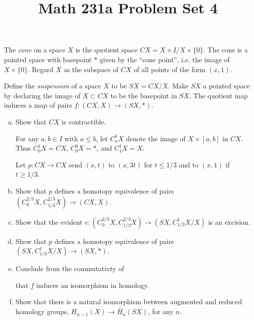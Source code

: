 \documentclass[11pt,letterpaper]{article}
\title{\textbf{Math 231a Problem Set 4}}
\begin{document}
\maketitle

\begin{problem}
    The \emph{cone} on a space $X$ is the quotient space $CX = X\times I/X\times \{0\}$. The cone is a pointed space with basepoint $*$ given by the ``cone point'', i.e. the image of $X\times \{0\}$. Regard $X$ as the subspace of $CX$ of all points of the form $(x,1)$. 
    
    Define the \emph{suspension} of a space $X$ to be $SX=CX/X$. Make $SX$ a pointed space by declaring the image of $X\subset CX$ to be the basepoint in $SX$. The quotient map induces a map of pairs $f : (CX,X) \to (SX,*)$.
    
    \begin{enumerate}[(a)]
        \item Show that $CX$ is contractible.
        
        For any $a,b\in I$ with $a\leq b$, let $C^b_aX$ denote the image of $X\times [a,b]$ in $CX$. Thus $C^1_0X = CX$, $C_0^0X=*$, and $C^1_1X=X$.

        Let $p : CX \to CX$ send $(x,t)$ to $(x,3t)$ for $t\leq 1 /3$ and to $(x,1)$ if $t\geq 1 /3$.

        \item Show that $p$ defines a homotopy equivalence of pairs $(C_0^{2 /3}X, C_{1 /3}^{2 /3}X) \to (CX, X)$.
        \item Show that the evident $e : (C^{2 /3}_0 X, C^{2 /3}_{1 /3}X) \to (SX, C^1_{1 /3}X /X)$ is an excision.
        \item Show that $p$ defines a homotopy equivalence of pairs $(SX, C^1_{1 /3}X/X) \to (SX,*)$.
        \item Conclude from the commutativty of 
        \begin{center}
        \end{center}
        that $f$ induces an isomorphism in homology.
        \item Show that there is a natural isomorphism between augmented and reduced homology groups, $H_{n-1}(X)\to \widetilde{H_n}(SX)$, for any $n$. 
    \end{enumerate}
\end{problem}
\end{document}
